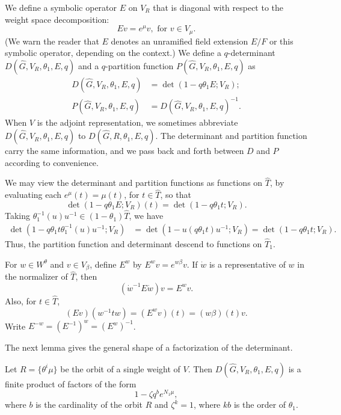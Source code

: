 We define a symbolic operator $E$ on $V_R$ that is diagonal with
respect to the weight space decomposition:
\[
E v = e^{\mu} v, \text{ for } v \in V_\mu.
\]
(We warn the reader that $E$ denotes an unramified field extension $E/F$
or this symbolic operator, depending on the context.)
We define a $q$-determinant $D(\hat G,V_R,\theta_1,E,q)$ and a
$q$-partition function $P(\hat G,V_R,\theta_1,E,q)$ as
\begin{align}\label{eqn:det}
D(\hat G,V_R,\theta_1,E,q) &= \det(1- q \theta_1 E;V_R);\\ 
P(\hat G,V_R,\theta_1,E,q) &= D(\hat G,V_R,\theta_1,E,q)^{-1}.
\end{align}
When $V$ is the adjoint representation, we sometimes abbreviate
$D(\hat G,V_R,\theta_1,E,q)$ to $D(\hat G,R,\theta_1,E,q)$.  The
determinant and partition function carry the same information, and we
pass back and forth between $D$ and $P$ according to convenience.

We may view the determinant and partition functions as functions on
$\hat T$, by evaluating each $e^\mu (t) = \mu(t)$, for $t\in \hat T$,
so that
\[
\det(1- q\theta_1 E;V_R)(t) = \det(1-q\theta_1 t;V_R).
\]
Taking $\theta_1^{-1}(u) u^{-1}\in (1-\theta_1)\hat T$, we have
\begin{align*}
\det (1-q \theta_1 t \theta_1^{-1}(u) u^{-1};V_R) 
&= \det(1- u (q \theta_1 t ) u^{-1};V_R) = \det(1-q\theta_1 t;V_R).
\end{align*}
Thus, the partition function and determinant descend to functions on
$\hat T_1$.  

For $w\in W^\theta$ and $v\in V_\beta$, define $E^w$ by $E^w v =
e^{w\beta} v$.  If $\dot w$ is a representative of $w$ in the
normalizer of $\hat T$, then
\[
(\dot w^{-1} E \dot w) v = E^w v.
\]
Also, for $t\in \hat T$,
\[
(E v) (w^{-1} t w) = (E^w v) (t) = (w\beta)(t) v.
\]
Write $E^{-w} = (E^{-1})^w = (E^w)^{-1}$.


The next lemma gives the general shape of a factorization
of the determinant.

\begin{lemma}\label{lemma:fact}  
  Let $R = \{\theta^i\mu\}$ be the orbit of a single weight of $V$.
  Then $D(\hat G,V_R,\theta_1,E,q)$ is a finite product of factors of
  the form
\[
1 - \zeta q^b e^{N_1\mu},
\]
where $b$ is the cardinality of the orbit $R$ and $\zeta^k=1$, where
$k b$ is the order of $\theta_1$.
\end{lemma}

